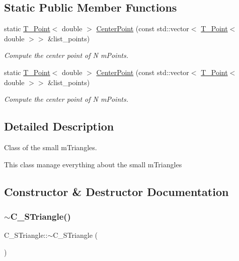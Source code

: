 \subsection*{Static Public Member Functions}
\begin{DoxyCompactItemize}
\item 
static \hyperlink{classT__Point}{T\+\_\+\+Point}$<$ double $>$ \hyperlink{classC__STriangle_a98c01a7d57aeee85ee4e2df88a786b7f}{Center\+Point} (const std\+::vector$<$ \hyperlink{classT__Point}{T\+\_\+\+Point}$<$ double $>$$>$ \&list\+\_\+points)
\begin{DoxyCompactList}\small\item\em Compute the center point of N m\+Points. \end{DoxyCompactList}\item 
static \hyperlink{classT__Point}{T\+\_\+\+Point}$<$ double $>$ \hyperlink{classC__STriangle_ae29fff7b2b4cb23c79886c28f4300ec6}{Center\+Point} (const std\+::vector$<$ \hyperlink{classT__Point}{T\+\_\+\+Point}$<$ double $>$$>$ \&list\+\_\+points)
\begin{DoxyCompactList}\small\item\em Compute the center point of N m\+Points. \end{DoxyCompactList}\end{DoxyCompactItemize}


\subsection{Detailed Description}
Class of the small m\+Triangles. 

This class manage everything about the small m\+Triangles 

\subsection{Constructor \& Destructor Documentation}
\mbox{\label{classC__STriangle_a545f9a8f64e89a4b1269f7ea93251e64}} 
\subsubsection{\texorpdfstring{$\sim$\+C\+\_\+\+S\+Triangle()}{~C\_STriangle()}\hspace{0.1cm}{\footnotesize\ttfamily [1/2]}}
{\footnotesize\ttfamily C\+\_\+\+S\+Triangle\+::$\sim$\+C\+\_\+\+S\+Triangle (\begin{DoxyParamCaption}{ }\end{DoxyParamCaption})\hspace{0.3cm}{\ttfamily [override]}}



